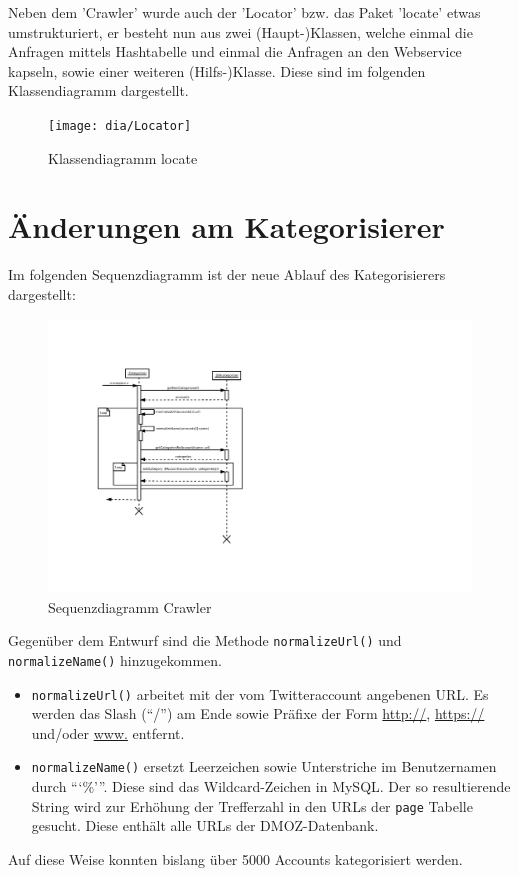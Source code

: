 Neben dem 'Crawler' wurde auch der 'Locator' bzw. das Paket 'locate' etwas umstrukturiert, er besteht nun aus zwei (Haupt-)Klassen, welche einmal die Anfragen mittels Hashtabelle und einmal die Anfragen an den Webservice kapseln, sowie einer weiteren (Hilfs-)Klasse. Diese sind im folgenden Klassendiagramm dargestellt.
 \begin{figure}[H]
 	\centering
 	\texttt{[image: dia/Locator]}
 	\caption{Klassendiagramm locate}
 	\label{fig:locate}
 \end{figure}

\section{Änderungen am Kategorisierer}
Im folgenden Sequenzdiagramm ist der neue Ablauf des Kategorisierers dargestellt:
\begin{figure}[H]
	\centering
	\includegraphics[width=\textwidth,height=\textheight,keepaspectratio=true]{dia/categorizerSequence}
	\caption{Sequenzdiagramm Crawler}
	\label{fig:Crawler}
\end{figure}
Gegenüber dem Entwurf sind die Methode \lstinline{normalizeUrl()} und \lstinline{normalizeName()} hinzugekommen.
\begin{itemize}
	\item \lstinline{normalizeUrl()} arbeitet mit der vom Twitteraccount angebenen URL. Es werden das Slash ("`/"') am Ende sowie Präfixe der Form \url{http://}, \url{https://} und/oder \url{www.} entfernt.
	\item \lstinline{normalizeName()} ersetzt Leerzeichen sowie Unterstriche im Benutzernamen durch ```\%'''. Diese sind das Wildcard-Zeichen in MySQL. Der so resultierende String wird zur Erhöhung der Trefferzahl in den URLs der \lstinline{page} Tabelle gesucht. Diese enthält alle URLs der DMOZ-Datenbank.
\end{itemize}
Auf diese Weise konnten bislang über 5000 Accounts kategorisiert werden.

